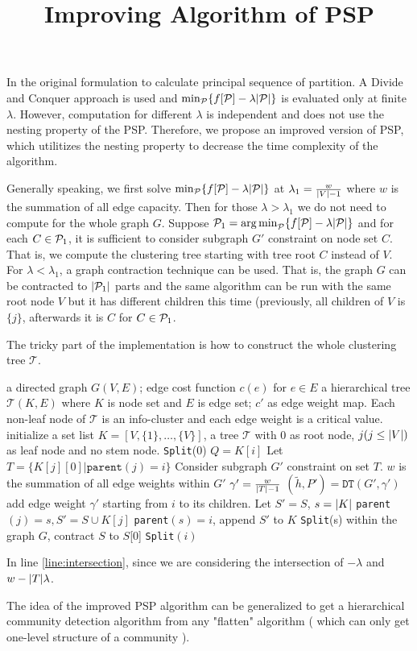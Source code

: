 \documentclass{article}
\title{Improving Algorithm of PSP}
\begin{document}
\maketitle

In the original formulation to calculate principal sequence of partition. A Divide and Conquer approach is used and $\min_{\P} \{f[\P]-\lambda \abs{\P}\}$ is evaluated only at finite $\lambda$. However, computation for different $\lambda$ is independent and does not use the nesting property of the PSP. Therefore, we propose an improved version of PSP, which utilitizes the nesting property to decrease the time complexity of the algorithm.

Generally speaking, we first solve $\min_{\P} \{ f[\P]-\lambda \abs{\P} \}$ at $\lambda_1 = \frac{w}{\abs{V}-1}$ where $w$ is the summation of all edge capacity. Then for those $\lambda > \lambda_1$ we do not need to compute for the whole graph $G$. Suppose $\P_1 = \argmin_{\P} \{ f[\P]-\lambda \abs{\P} \}$ and for each $ C \in \P_1$, it is sufficient to consider subgraph $G'$ constraint on node set $C$. That is, we compute the clustering tree starting with tree root $C$ instead of $V$. For $\lambda < \lambda_1$, a graph contraction technique can be used. That is, the graph $G$ can be contracted to $\abs{\P_1}$ parts and the same algorithm can be run with the same root node $V$ but it has different children this time (previously, all children of $V$ is $\{j\}$, afterwards it is $C$ for $C \in \P_1$.

The tricky part of the implementation is how to construct the whole clustering tree $\mathcal{T}$.

\begin{algorithm}
\caption{}\label{alg:psp_a}
\begin{algorithmic}[1]
\REQUIRE a directed graph $G(V, E)$; edge cost function $c(e)$ for $e\in E$
\ENSURE a hierarchical tree $\mathcal{T}(K, E)$ where $K$ is node set and $E$ is edge set; $c'$ as edge weight map. Each non-leaf node of $\mathcal{T}$ is an info-cluster and each edge weight is a critical value. 
\STATE initialize a set list $K=[V, \{1\}, \dots, \{V\}]$, a tree $\mathcal{T}$ with 0 as root node, $j(j\leq \abs{V})$ as leaf node and no stem node.
\STATE \texttt{Split}(0)
\STATE $Q=K[i]$
\STATE Let $T=\{K[j][0] | \texttt{parent}(j) = i\}$
\STATE Consider subgraph $G'$ constraint on set $T$. $w$ is the summation of all edge weights within $G'$ 
\STATE $\gamma' = \frac{w}{\abs{T}-1}$ \label{line:intersection}
\STATE $(\tilde{h}, P') = \texttt{DT}(G', \gamma')$
\STATE add edge weight $\gamma'$ starting from $i$ to its children.
\ELSE
{}
\STATE Let $S'=S$, $s=\abs{K}$%
\STATE \texttt{parent}$(j)=s, S'=S\cup K[j]$
\ENDIF
\ENDFOR
\STATE \texttt{parent}$(s)=i$, append $S'$ to $K$
\STATE \texttt{Split}(s)
\STATE within the graph $G$, contract $S$ to $S$[0]
\ENDFOR
\STATE \texttt{Split}$(i)$ %
\ENDIF
\ENDFUNCTION
\end{algorithmic}
\end{algorithm}
In line \ref{line:intersection}, since we are considering the intersection of $-\lambda$ and $w-\abs{T}\lambda $.

The idea of the improved PSP algorithm can be generalized to get a hierarchical community detection algorithm from any "flatten" algorithm ( which can only get one-level structure of a community ).
\end{document}
